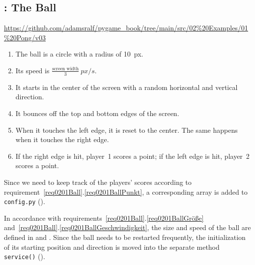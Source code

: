 

\subsection{: The Ball}
\begin{diskbox}
	\url{https://github.com/adamsralf/pygame_book/tree/main/src/02%20Examples/01%20Pong/v03}
\end{diskbox}
\begin{enumerate}
	\item The ball is a circle with a radius of \SI{10}{px}.\label{req0201BallGröße}
	\item Its speed is $\frac{\text{screen width}}{3}~px/s$.\label{req0201BallGeschwindigkeit}
	\item It starts in the center of the screen with a random horizontal and vertical direction.\label{req0201BallStart}
	\item It bounces off the top and bottom edges of the screen.\label{req0201BallObenUnten}
	\item When it touches the left edge, it is reset to the center. The same happens when it touches the right edge.\label{req0201BallRechtsLinks}
	\item If the right edge is hit, player~1 scores a point; if the left edge is hit, player~2 scores a point.\label{req0201BallPunkt}
\end{enumerate}
\er

Since we need to keep track of the players’ scores according to requirement~\ref{req0201Ball}.\ref{req0201BallPunkt}, a corresponding array is added to \texttt{config.py} ().
 

In accordance with requirements~\ref{req0201Ball}.\ref{req0201BallGröße} and~\ref{req0201Ball}.\ref{req0201BallGeschwindigkeit}, the size and speed of the ball are defined in  and . Since the ball needs to be restarted frequently, the initialization of its starting position and direction is moved into the separate method \texttt{service()} ().

